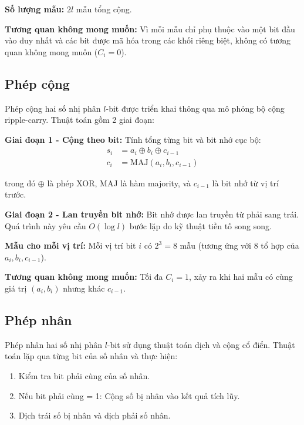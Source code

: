 \textbf{Số lượng mẫu:} $2l$ mẫu tổng cộng.

\vspace{0.2cm}

\textbf{Tương quan không mong muốn:} Vì mỗi mẫu chỉ phụ thuộc vào một bit đầu vào duy nhất và các bit được mã hóa trong các khối riêng biệt, không có tương quan không mong muốn ($C_i = 0$).

\subsection{Phép cộng}

Phép cộng hai số nhị phân $l$-bit được triển khai thông qua mô phỏng bộ cộng ripple-carry. Thuật toán gồm 2 giai đoạn:

\vspace{0.2cm}

\textbf{Giai đoạn 1 - Cộng theo bit:} Tính tổng từng bit và bit nhớ cục bộ:
\begin{align}
    s_i &= a_i \oplus b_i \oplus c_{i-1} \\
    c_i &= \text{MAJ}(a_i, b_i, c_{i-1})
\end{align}

trong đó $\oplus$ là phép XOR, MAJ là hàm majority, và $c_{i-1}$ là bit nhớ từ vị trí trước.

\vspace{0.2cm}

\textbf{Giai đoạn 2 - Lan truyền bit nhớ:} Bit nhớ được lan truyền từ phải sang trái. Quá trình này yêu cầu $O(\log l)$ bước lặp do kỹ thuật tiền tố song song.

\vspace{0.2cm}

\textbf{Mẫu cho mỗi vị trí:} Mỗi vị trí bit $i$ có $2^3 = 8$ mẫu (tương ứng với 8 tổ hợp của $a_i, b_i, c_{i-1}$).

\vspace{0.2cm}

\textbf{Tương quan không mong muốn:} Tối đa $C_i = 1$, xảy ra khi hai mẫu có cùng giá trị $(a_i, b_i)$ nhưng khác $c_{i-1}$.

\subsection{Phép nhân}

Phép nhân hai số nhị phân $l$-bit sử dụng thuật toán dịch và cộng cổ điển. Thuật toán lặp qua từng bit của số nhân và thực hiện:
\begin{enumerate}
    \item Kiểm tra bit phải cùng của số nhân.
    \item Nếu bit phải cùng = 1: Cộng số bị nhân vào kết quả tích lũy.
    \item Dịch trái số bị nhân và dịch phải số nhân.
\end{enumerate}

